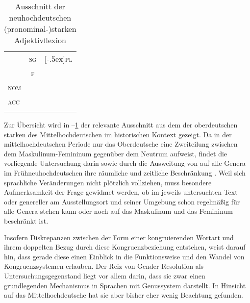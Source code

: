 {\begin{table}
\centering
\caption%
	{Ausschnitt der neuhochdeutschen (pronominal-)starken
	Adjektivflexion
	\autocites[vgl.][772]{woellstein2022}}
\begin{tabular}{l c c}
	\lsptoprule

		& \textsc{sg}
		& \mr{2}{*}[-.5ex]{\textsc{pl}}
	\\

	\cmidrule(lr){2-2}

		& \textsc{f}
		\\

	\midrule

	\textsc{nom}
		& \cellcolor{black!33}{-e}
		& \cellcolor{black!33}{-e}
		\\
	\textsc{acc}
		& \cellcolor{black!33}{-e}
		& \cellcolor{black!33}{-e}
		\\
	\lspbottomrule
\end{tabular}
\label{tab:nhd_stradj}
\end{table}}

Zur Übersicht wird in --\ref{tab:nhd_stradj} der
relevante Ausschnitt aus dem  der oberdeutschen
starken  des Mittelhochdeutschen
im historischen Kontext gezeigt. Da in der
mittelhochdeutschen Periode nur das
Oberdeutsche eine Zweiteilung zwischen dem Maskulinum-Femininum
gegenüber dem Neutrum aufweist, findet die vorliegende Untersuchung darin sowie
durch die Ausweitung von \mbox{} auf alle Genera im
Früh\-neu\-hoch\-deutschen ihre räumliche und zeitliche
Beschränkung
\autocites[vgl.][191--192]{reichmannwegera1993}[181--184]{ksw2}. Weil sich
sprachliche Veränderungen nicht plötzlich vollziehen, muss besondere
Aufmerksamkeit der Frage gewidmet werden, ob  im jeweils untersuchten
Text oder genereller am Ausstellungsort und seiner Umgebung schon regelmäßig
für alle Genera stehen kann oder noch auf das Maskulinum und das Femininum
beschränkt ist.

Insofern Diskrepanzen zwischen der Form einer kongruierenden Wortart und ihrem
doppelten Bezug durch diese 
Kongruenzbeziehung entstehen, weist
\citet[144]{corbett2006} darauf hin, dass gerade diese einen Einblick in die
Funktionsweise und den Wandel von Kongruenz\-systemen erlauben. Der Reiz von
Gender Resolution als Untersuchungsgegenstand liegt vor allem darin, dass sie
zwar einen grundlegenden Mechanismus in Sprachen mit Genussystem darstellt. In
Hinsicht auf das Mittelhochdeutsche hat sie aber bisher
eher wenig Beachtung gefunden.

